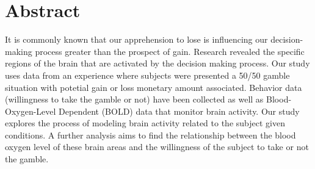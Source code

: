 \section{Abstract}
\noindent
It is commonly known that our apprehension to lose is influencing our decision-making
process greater than the prospect of gain. Research revealed the specific regions of
the brain that are activated by the decision making process. Our study uses data from
an experience where subjects were presented a 50/50 gamble situation with potetial 
gain or loss monetary amount associated.
Behavior data (willingness to take the gamble or not) have been collected as well as
Blood-Oxygen-Level Dependent (BOLD) data that monitor brain activity. Our study 
explores the process of modeling brain activity related to the subject given conditions.
A further analysis aims to find the relationship between the blood oxygen level of these 
brain areas and the willingness of the subject to take or not the gamble. 

